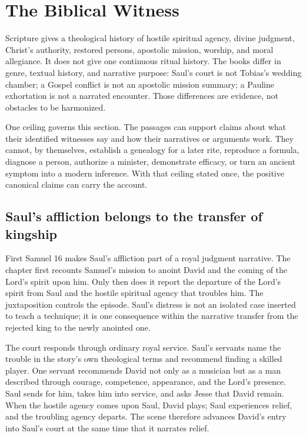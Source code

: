\section{The Biblical Witness}

Scripture gives a theological history of hostile spiritual agency, divine
judgment, Christ's authority, restored persons, apostolic mission, worship,
and moral allegiance. It does not give one continuous ritual history. The
books differ in genre, textual history, and narrative purpose: Saul's court is
not Tobias's wedding chamber; a Gospel conflict is not an apostolic mission
summary; a Pauline exhortation is not a narrated encounter. Those differences
are evidence, not obstacles to be harmonized.

One ceiling governs this section. The passages can support claims about what
their identified witnesses say and how their narratives or arguments work.
They cannot, by themselves, establish a genealogy for a later rite, reproduce
a formula, diagnose a person, authorize a minister, demonstrate efficacy,
or turn an ancient symptom into a modern inference. With that ceiling stated
once, the positive canonical claims can carry the account.

\subsection{Saul's affliction belongs to the transfer of kingship}

First Samuel 16 makes Saul's affliction part of a royal judgment narrative.
The chapter first recounts Samuel's mission to anoint David and the coming of
the Lord's spirit upon him. Only then does it report the departure of the
Lord's spirit from Saul and the hostile spiritual agency that troubles him.
The juxtaposition controls the episode. Saul's distress is not an isolated
case inserted to teach a technique; it is one consequence within the
narrative transfer from the rejected king to the newly anointed one.

The court responds through ordinary royal service. Saul's servants name the
trouble in the story's own theological terms and recommend finding a skilled
player. One servant recommends David not only as a musician but as a man
described through courage, competence, appearance, and the Lord's presence.
Saul sends for him, takes him into service, and asks Jesse that David remain.
When the hostile agency comes upon Saul, David plays; Saul experiences relief,
and the troubling agency departs. The scene therefore advances David's entry
into Saul's court at the same time that it narrates relief.

